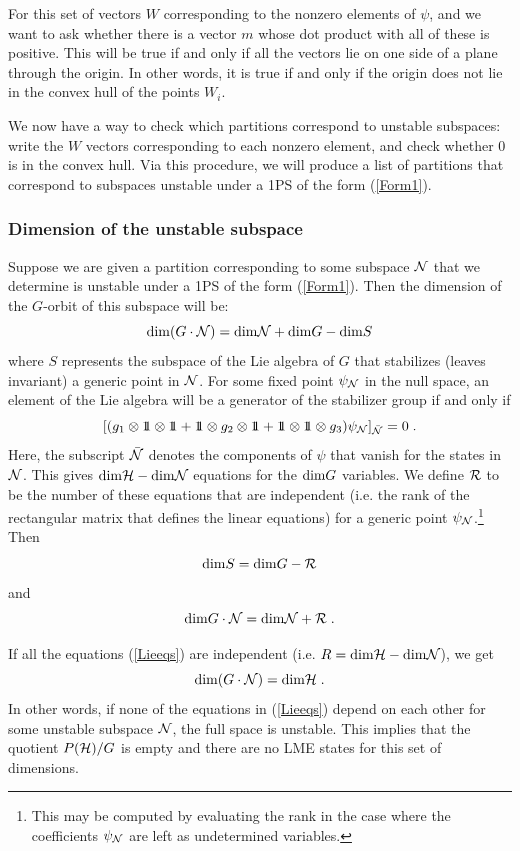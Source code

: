 \documentclass[12pt]{article}
\theoremstyle{definition}
\newcommand{\be}{\begin{equation}}
\newcommand{\ee}{\end{equation}}
\def\identity{{\rlap{1} \hskip 1.6pt \hbox{1}}}
\begin{document}
For this set of vectors $W$ corresponding to the nonzero elements of $\psi$, and we want to ask whether there is a vector $m$ whose dot product with all of these is positive. This will be true if and only if all the vectors lie on one side of a plane through the origin. In other words, it is true if and only if the origin does not lie in the convex hull of the points $W_i$.

We now have a way to check which partitions correspond to unstable subspaces: write the $W$ vectors corresponding to each nonzero element, and check whether 0 is in the convex hull. Via this procedure, we will produce a list of partitions that correspond to subspaces unstable under a 1PS of the form (\ref{Form1}).

\subsubsection*{Dimension of the unstable subspace}

Suppose we are given a partition corresponding to some subspace ${\cal N}$ that we determine is unstable under a 1PS of the form (\ref{Form1}). Then the dimension of the $G$-orbit of this subspace will be:
\be
\label{dimensions}
{\rm dim}( G \cdot {\cal N}) = {\rm dim} {\cal N} + {\rm dim} G - {\rm dim} S
\ee
where $S$ represents the subspace of the Lie algebra of $G$ that stabilizes (leaves invariant) a generic point in ${\cal N}$. For some fixed point $\psi_{\cal N}$ in the null space, an element of the Lie algebra will be a generator of the stabilizer group if and only if
\be
\label{Lieeqs}
[(g_1 \otimes \identity \otimes \identity + \identity \otimes g_2 \otimes \identity + \identity \otimes \identity \otimes g_3 ) \psi_{\cal N} ]_{\bar{\cal N}} = 0 \; .
\ee
Here, the subscript $\bar{\cal N}$ denotes the components of $\psi$ that vanish for the states in ${\cal N}$. This gives ${\rm dim}{\cal H} - {\rm dim} {\cal N}$ equations for the ${\rm dim}G$ variables. We define ${\cal R}$ to be the number of these equations that are independent (i.e. the rank of the rectangular matrix that defines the linear equations) for a generic point $\psi_{\cal N}$.\footnote{This may be computed by evaluating the rank in the case where the coefficients $\psi_{\cal N}$ are left as undetermined variables.} Then
\be
{\rm dim} S = {\rm dim}G - {\cal R}
\ee
and
\be
{\rm dim} G \cdot {\cal N} = {\rm dim} {\cal N} + {\cal R} \; .
\ee

If all the equations (\ref{Lieeqs}) are independent (i.e. $R = {\rm dim}{\cal H} - {\rm dim} {\cal N}$), we get
\be
{\rm dim} (G \cdot {\cal N}) = {\rm dim}{\cal H} \; .
\ee
In other words, if none of the equations in (\ref{Lieeqs}) depend on each other for some unstable subspace ${\cal N}$, the full space is unstable. This implies that the quotient $P({\cal H})/G$ is empty and there are no LME states for this set of dimensions.
\end{document}
